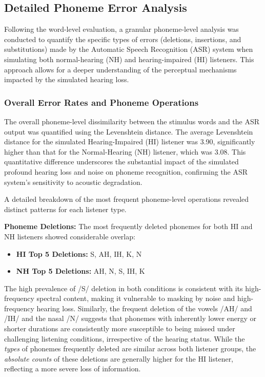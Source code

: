 \documentclass{article}
\begin{document}
\subsection{Detailed Phoneme Error Analysis}
Following the word-level evaluation, a granular phoneme-level analysis was conducted to quantify the specific types of errors (deletions, insertions, and substitutions) made by the Automatic Speech Recognition (ASR) system when simulating both normal-hearing (NH) and hearing-impaired (HI) listeners. This approach allows for a deeper understanding of the perceptual mechanisms impacted by the simulated hearing loss.

\subsubsection{Overall Error Rates and Phoneme Operations}
The overall phoneme-level dissimilarity between the stimulus words and the ASR output was quantified using the Levenshtein distance. The average Levenshtein distance for the simulated Hearing-Impaired (HI) listener was 3.90, significantly higher than that for the Normal-Hearing (NH) listener, which was 3.08. This quantitative difference underscores the substantial impact of the simulated profound hearing loss and noise on phoneme recognition, confirming the ASR system's sensitivity to acoustic degradation.

A detailed breakdown of the most frequent phoneme-level operations revealed distinct patterns for each listener type.

\textbf{Phoneme Deletions:}
The most frequently deleted phonemes for both HI and NH listeners showed considerable overlap:
\begin{itemize}
    \item \textbf{HI Top 5 Deletions:} S, AH, IH, K, N
    \item \textbf{NH Top 5 Deletions:} AH, N, S, IH, K
\end{itemize}
The high prevalence of /S/ deletion in both conditions is consistent with its high-frequency spectral content, making it vulnerable to masking by noise and high-frequency hearing loss. Similarly, the frequent deletion of the vowels /AH/ and /IH/ and the nasal /N/ suggests that phonemes with inherently lower energy or shorter durations are consistently more susceptible to being missed under challenging listening conditions, irrespective of the hearing status. While the \textit{types} of phonemes frequently deleted are similar across both listener groups, the \textit{absolute counts} of these deletions are generally higher for the HI listener, reflecting a more severe loss of information.
\end{document}
